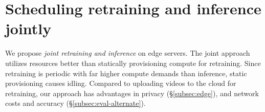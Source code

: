 \section{Scheduling retraining and inference jointly}
\label{sec:motivation}

We propose \emph{joint retraining and inference} on edge servers.
The joint approach utilizes resources better than statically provisioning compute for retraining. Since retraining is periodic \cite{distribution-20, mullapudi2019} with far higher compute demands than inference, static provisioning causes idling.  
Compared to uploading videos to the cloud for retraining, our approach has advantages in privacy (\S\ref{subsec:edge}), and network costs and accuracy (\S\ref{subsec:eval-alternate}).


